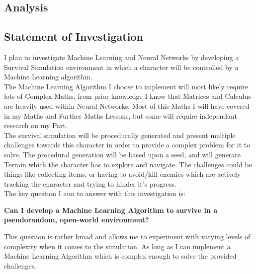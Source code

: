\begin{flushleft}
    \section{Analysis}
        \subsection{Statement of Investigation}
            \large
            \vspace{0.2cm}
            I plan to investigate Machine Learning and Neural Networks by developing a Survival Simulation environment 
            in which a character will be controlled by a Machine Learning algorithm. \\
            \vspace{0.2cm}
            The Machine Learning Algorithm I choose to implement will most likely require lots of Complex Maths, from prior knowledge
            I know that Matrices and Calculus are heavily used within Neural Networks. Most of this Maths I will have 
            covered in my Maths and Further Maths Lessons, but some will require independant research on my Part. \\
            \vspace{0.2cm}
            The survival simulation will be procedurally generated and present multiple challenges 
            towards this character in order to provide a complex problem for it to solve. The procedural generation will
            be based upon a seed, and will generate Terrain which the character has to explore and navigate. The challenges 
            could be things like collecting items, or having to avoid/kill enemies which are actively tracking the character 
            and trying to hinder it's progress. \\
            \vspace{0.2cm}
            The key question I aim to answer with this investigation is:

            \begin{center}
                \vspace{0.3cm}
                \textbf{Can I develop a Machine Learning Algorithm to survive in a pseudorandom, open-world environment?}
                \vspace{0.3cm}
            \end{center}

            This question is rather broad and allows me to experiment with varying levels of complexity when it comes to
            the simulation. As long as I can implement a Machine Learning Algorithm which is complex enough to solve the 
            provided challenges. \\
            \vspace{0.2cm}

\end{flushleft}
